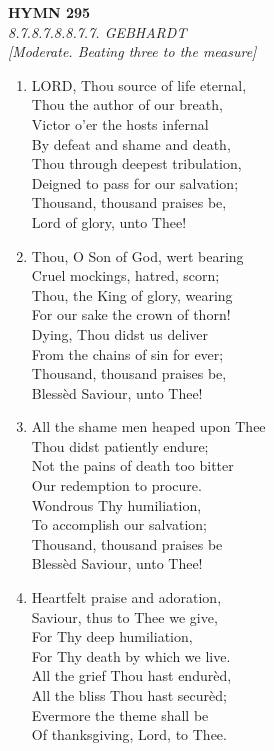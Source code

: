 \documentclass[11pt,a4paper]{article}
\begin{document}
\newpage
\begin{center}
    {\Large \textbf{HYMN 295}}
    \\
    \textit{8.7.8.7.8.8.7.7. GEBHARDT}
    \\
    \textit{\small [Moderate. Beating three to the measure]}
\end{center}
\vspace{1em}

\begin{enumerate}
    \item LORD, Thou source of life eternal, \\
        Thou the author of our breath, \\
        Victor o'er the hosts infernal \\
        By defeat and shame and death, \\
        Thou through deepest tribulation, \\
        Deigned to pass for our salvation; \\
        Thousand, thousand praises be, \\
        Lord of glory, unto Thee!

    \item Thou, O Son of God, wert bearing \\
        Cruel mockings, hatred, scorn; \\
        Thou, the King of glory, wearing \\
        For our sake the crown of thorn! \\
        Dying, Thou didst us deliver \\
        From the chains of sin for ever; \\
        Thousand, thousand praises be, \\
        Bless\`ed Saviour, unto Thee!

    \item All the shame men heaped upon Thee \\
        Thou didst patiently endure; \\
        Not the pains of death too bitter \\
        Our redemption to procure. \\
        Wondrous Thy humiliation, \\
        To accomplish our salvation; \\
        Thousand, thousand praises be \\
        Bless\`ed Saviour, unto Thee!

    \item Heartfelt praise and adoration, \\
        Saviour, thus to Thee we give, \\
        For Thy deep humiliation, \\
        For Thy death by which we live. \\
        All the grief Thou hast endur\`ed, \\
        All the bliss Thou hast secur\`ed; \\
        Evermore the theme shall be \\
        Of thanksgiving, Lord, to Thee.

\end{enumerate}
\end{document}
